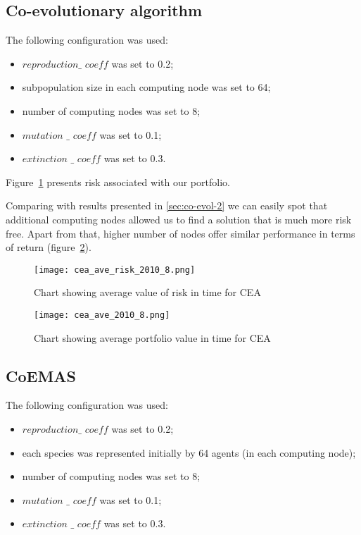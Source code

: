 \subsection{Co-evolutionary algorithm}

The following configuration was used:
\begin{itemize}
  \item $reproduction\_$ $coeff$ was set to 0.2;
  \item subpopulation size in each computing node was set to 64;
  \item number of computing nodes was set to 8;
  \item $mutation$ $\_$ $coeff$ was set to 0.1;
  \item $extinction$ $\_$ $coeff$ was set to 0.3.
\end{itemize}

Figure~\ref{fig:co_evol_8_risk} presents risk associated with our portfolio.

Comparing with results presented in \ref{sec:co-evol-2} we can easily spot that additional computing nodes allowed us to find a solution that is much more risk free.
Apart from that, higher number of nodes offer similar performance in terms of return (figure~\ref{fig:co_evol_8_return}).

\begin{figure}[ht]
  \begin{center}
    \texttt{[image: cea\_ave\_risk\_2010\_8.png]}
  \end{center}
  \caption{Chart showing average value of risk in time for CEA}
  \label{fig:co_evol_8_risk}
\end{figure}

\begin{figure}[ht]
  \begin{center}
    \texttt{[image: cea\_ave\_2010\_8.png]}
  \end{center}
  \caption{Chart showing average portfolio value in time for CEA}
  \label{fig:co_evol_8_return}
\end{figure}

\subsection{CoEMAS}

The following configuration was used:
\begin{itemize}
  \item $reproduction\_$ $coeff$ was set to 0.2;
  \item each species was represented initially by 64 agents (in each computing node);
  \item number of computing nodes was set to 8;
  \item $mutation$ $\_$ $coeff$ was set to 0.1;
  \item $extinction$ $\_$ $coeff$ was set to 0.3.
\end{itemize}


